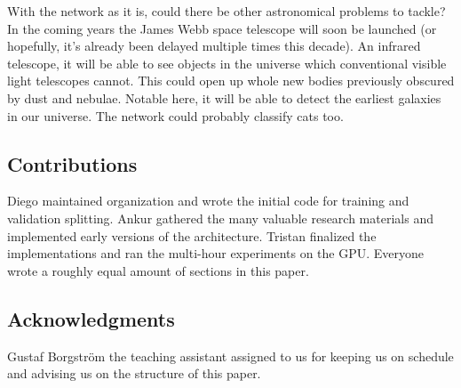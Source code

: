 With the network as it is, could there be other astronomical problems to tackle? In the coming years the James Webb space telescope will soon be launched (or hopefully, it's already been delayed multiple times this decade). An infrared telescope, it will be able to see objects in the universe which conventional visible light telescopes cannot. This could open up whole new bodies previously obscured by dust and nebulae. Notable here, it will be able to detect the earliest galaxies in our universe. The network could probably classify cats too.


\subsection{Contributions}
Diego maintained organization and wrote the initial code for training and validation splitting. Ankur gathered the many valuable research materials and implemented early versions of the \vgg architecture. Tristan finalized the implementations and ran the multi-hour experiments on the GPU. Everyone wrote a roughly equal amount of sections in this paper.

\subsection{Acknowledgments}

Gustaf Borgström the teaching assistant assigned to us for keeping us on schedule and advising us on the structure of this paper.
